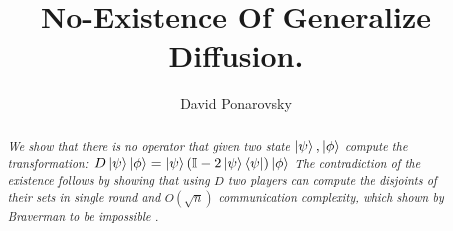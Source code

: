 \documentclass{article}
\begin{document}
\title{No-Existence Of Generalize Diffusion.}
\author{David Ponarovsky}
\maketitle

\begin{abstract}\textit{We show that there is no operator that given two state $\ket{\psi},\ket{\phi}$ compute the transformation: $D \ket{\psi}\ket{\phi} = \ket{\psi}\left( \mathbb{I} - 2 \ket{\psi}\bra{\psi} \right)\ket{\phi} $ The contradiction of the existence follows by showing that using $D$ two players can compute the disjoints of their sets in single round and $O\left( \sqrt{n} \right)$ communication complexity, which shown by Braverman to be impossible \cite{Braverman}. }
\end{abstract}
\end{document}
